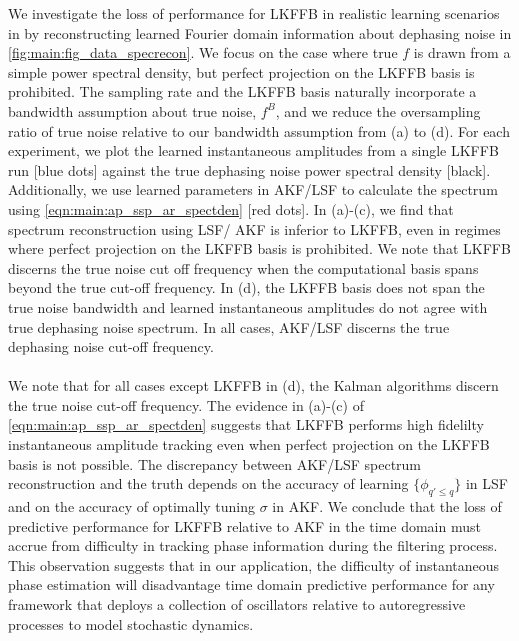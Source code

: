 We investigate the loss of performance for LKFFB in realistic learning scenarios in by reconstructing learned Fourier domain information about dephasing noise in \cref{fig:main:fig_data_specrecon}. We focus on the case where true $f$ is drawn from a simple power spectral density, but perfect projection on the LKFFB basis is prohibited. The sampling rate and the LKFFB basis naturally incorporate a bandwidth assumption about true noise, $f^B$, and we reduce the oversampling ratio of true noise relative to our bandwidth assumption from (a) to (d). For each experiment, we plot the learned instantaneous amplitudes from a single LKFFB run [blue dots] against the true dephasing noise power spectral density [black]. Additionally, we use learned parameters in AKF/LSF to calculate the spectrum using \cref{eqn:main:ap_ssp_ar_spectden} [red dots]. In (a)-(c), we find that spectrum reconstruction using LSF/ AKF is inferior to LKFFB, even in regimes where perfect projection  on the LKFFB basis is prohibited. We note that LKFFB discerns the true noise cut off frequency when the computational basis spans beyond the true cut-off frequency.  In (d), the LKFFB basis does not span the true noise bandwidth and learned instantaneous amplitudes do not agree with true dephasing noise spectrum. In all cases, AKF/LSF discerns the true dephasing noise cut-off frequency. 
\\
\\
 We note that for all cases except LKFFB in (d), the Kalman algorithms discern the true noise cut-off frequency. The evidence in (a)-(c) of \cref{eqn:main:ap_ssp_ar_spectden} suggests that LKFFB performs high fidelilty instantaneous amplitude tracking even when perfect projection on the LKFFB basis is not possible. The discrepancy between AKF/LSF spectrum reconstruction and the truth depends on the accuracy of learning $\{\phi_{q' \leq q}\}$ in LSF and on the accuracy of optimally tuning $\sigma$ in AKF.  We conclude that the loss of predictive performance for LKFFB relative to AKF in the time domain must accrue from difficulty in tracking phase information during the filtering process.  This observation suggests that in our application, the difficulty of instantaneous phase estimation will disadvantage time domain predictive performance for any framework that deploys a collection of oscillators relative to autoregressive processes to model stochastic dynamics.
\\
\\
